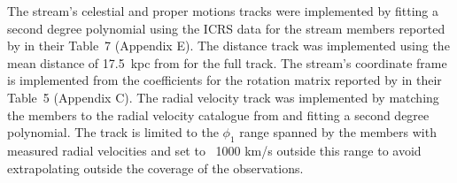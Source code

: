 The stream's celestial and proper motions tracks were implemented by fitting a second degree polynomial using the ICRS data for the stream members reported by \citet{Shipp2019} in their Table~7 (Appendix E). The distance track was implemented using the mean distance of 17.5~kpc from \citet{Balbinot2016} for the full track. The stream's coordinate frame is implemented from the coefficients for the rotation matrix reported by \citet{Shipp2019} in their Table~5 (Appendix C). The radial velocity track was implemented by matching the \citet{Shipp2019} members to the radial velocity catalogue from \citet{Li2022} and fitting a second degree polynomial. The track is limited to the $\phi_1$ range spanned by the members with measured radial velocities and set to ~1000 km/s outside this range to avoid extrapolating outside the coverage of the observations.
